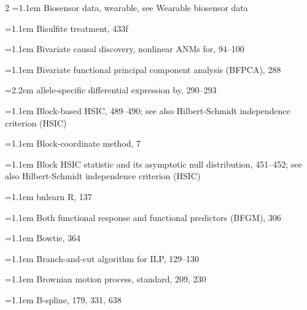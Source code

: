 \begin{multicols}{2}
\noindent\hangindent=1.1em Biosensor data, wearable, see Wearable biosensor data\par
\noindent\hangindent=1.1em Bisulfite treatment, 433f\par
\noindent\hangindent=1.1em Bivariate causal discovery, nonlinear ANMs for, 94--100\par
\noindent\hangindent=1.1em Bivariate functional principal component analysis (BFPCA), 288\par
\noindent\hangindent=2.2em \hspace*{1.1em}allele-specific differential expression by, 290--293\par
\noindent\hangindent=1.1em Block-based HSIC, 489--490; see also Hilbert-Schmidt independence criterion (HSIC)\par
\noindent\hangindent=1.1em Block-coordinate method, 7\par
\noindent\hangindent=1.1em Block HSIC statistic and its asymptotic null distribution, 451--452; see also Hilbert-Schmidt independence criterion (HSIC)\par
\noindent\hangindent=1.1em bnlearn R, 137\par
\noindent\hangindent=1.1em Both functional response and functional predictors (BFGM), 306\par
\noindent\hangindent=1.1em Bowtie, 364\par
\noindent\hangindent=1.1em Branch-and-cut algorithm for ILP, 129--130\par
\noindent\hangindent=1.1em Brownian motion process, standard, 209, 230\par
\noindent\hangindent=1.1em B-spline, 179, 331, 638\par


\end{multicols}
